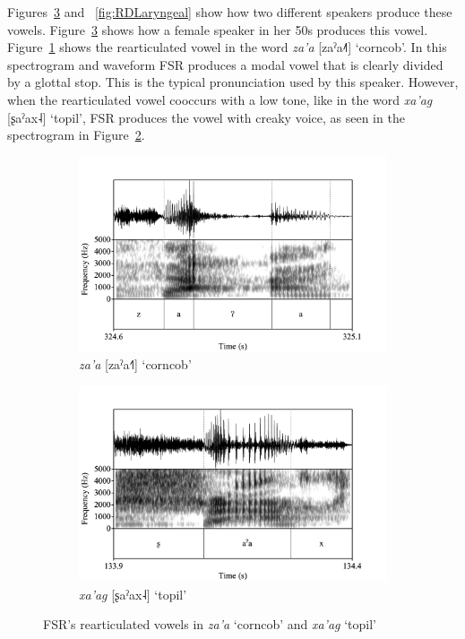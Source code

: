 Figures~\ref{fig:FSRLaryngeal} and ~\ref{fig:RDLaryngeal} show how two different speakers produce these vowels. Figure~\ref{fig:FSRLaryngeal} shows how a female speaker in her 50s produces this vowel. Figure~\ref{fig:FSRza'a} shows the rearticulated vowel in the word \textit{za'a} [zaˀa˨˥] `corncob'. In this spectrogram and waveform FSR produces a modal vowel that is clearly divided by a glottal stop. This is the typical pronunciation used by this speaker. However, when the rearticulated vowel cooccurs with a low tone, like in the word \textit{xa'ag} [ʂaˀax˨] `topil', FSR produces the vowel with creaky voice, as seen in the spectrogram in Figure~\ref{fig:FSRxa'ag}.

\begin{figure}[h!]
	\centering
	\begin{subfigure}{.5\textwidth}
		\centering
		\includegraphics[width=\linewidth]{Images/Spectrograms/za'a.png}
		\caption{\textit{za'a} [zaˀa˧˥] `corncob'}
		\label{fig:FSRza'a}
	\end{subfigure}%
	\begin{subfigure}{.5\textwidth}
		\centering
		\includegraphics[width=\linewidth]{Images/Spectrograms/xa'ag.png}
		\caption{\textit{xa'ag} [ʂaˀax˨] `topil'}
		\label{fig:FSRxa'ag}
	\end{subfigure}	
	\caption{FSR's rearticulated vowels in \textit{za'a} `corncob' and \textit{xa'ag} `topil'}
	\label{fig:FSRLaryngeal}
\end{figure}

